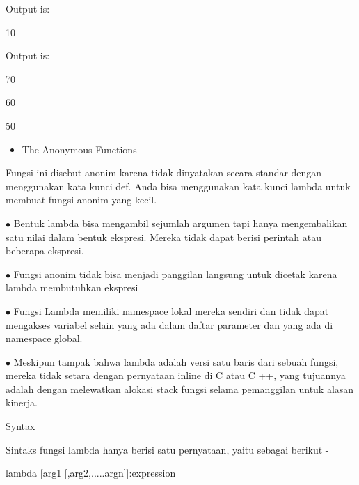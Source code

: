 \noindent 
 \hspace*{0.5in} Output is: \par
\noindent 
 \hspace*{0.5in} 10 \par
 \vspace{\baselineskip}
\noindent 
 \hspace*{0.5in} Output is: \par
\noindent 
 \hspace*{0.5in} 70 \par
\noindent 
 \hspace*{0.5in} 60 \par
\noindent 
 \hspace*{0.5in} 50 \par
 \vspace{\baselineskip}
\noindent 
\begin{itemize}
	\item The Anonymous Functions
\end{itemize}
\noindent 
Fungsi ini disebut anonim karena tidak dinyatakan secara standar dengan menggunakan kata kunci def. Anda bisa menggunakan kata kunci lambda untuk membuat fungsi anonim yang kecil. \par
\noindent 
$ \bullet $ Bentuk lambda bisa mengambil sejumlah argumen tapi hanya mengembalikan satu nilai dalam bentuk ekspresi. Mereka tidak dapat berisi perintah atau beberapa ekspresi. \par
\noindent 
$ \bullet $ Fungsi anonim tidak bisa menjadi panggilan langsung untuk dicetak karena lambda membutuhkan ekspresi \par
\noindent 
$ \bullet $ Fungsi Lambda memiliki namespace lokal mereka sendiri dan tidak dapat mengakses variabel selain yang ada dalam daftar parameter dan yang ada di namespace global. \par
\noindent 
$ \bullet $ Meskipun tampak bahwa lambda adalah versi satu baris dari sebuah fungsi, mereka tidak setara dengan pernyataan inline di C atau C ++, yang tujuannya adalah dengan melewatkan alokasi stack fungsi selama pemanggilan untuk alasan kinerja. \par
\vspace{12pt}
\vspace{12pt}
\noindent 
Syntax \par
\vspace{\baselineskip}
\noindent 
Sintaks fungsi lambda hanya berisi satu pernyataan, yaitu sebagai berikut - \par
\noindent 
 \hspace*{0.5in} lambda [arg1 [,arg2,.....argn]]:expression \par
